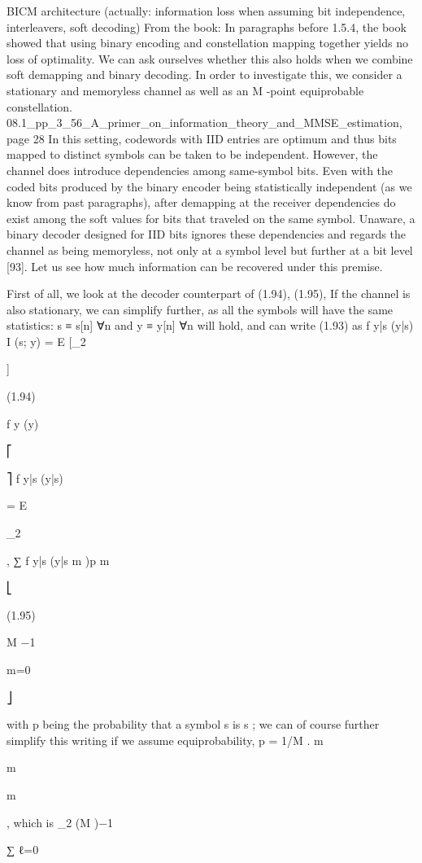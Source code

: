 {BICM architecture (actually: information loss when assuming bit independence, interleavers, soft decoding)
From the book:
In paragraphs before 1.5.4, the book showed that using binary encoding and constellation mapping together yields no loss of optimality. We can ask ourselves whether this also holds when we combine soft demapping and binary decoding.
In order to investigate this, we consider a stationary and memoryless channel as well as an M -point equiprobable constellation.
08.1_pp_3_56_A_primer_on_information_theory_and_MMSE_estimation, page 28 In this setting, codewords with IID entries are optimum and thus bits mapped to distinct symbols can be taken to be independent. However, the channel does introduce dependencies among same-symbol bits. Even with the coded bits produced by the binary encoder being statistically independent (as we know from past paragraphs), after demapping at the receiver dependencies do exist among the soft values for bits that traveled on the same symbol. Unaware, a binary decoder designed for IID bits ignores these dependencies and regards the channel as being memoryless, not only at a symbol level but further at a bit level [93]. Let us see how much information can be recovered under this premise.

First of all, we look at the decoder counterpart of (1.94), (1.95),
If the channel is also stationary, we can simplify further, as all the symbols will have the same statistics: s ≡ s[n] ∀n and y ≡ y[n] ∀n will hold, and can write (1.93) as f y|s (y|s)
I (s; y) = E [\log_2

]

(1.94)

f y (y)

⎡

⎤
f y|s (y|s)

= E

\log_2

,
∑ f y|s (y|s m )p m

⎣

(1.95)

M −1

m=0

⎦

with p being the probability that a symbol s is s ; we can of course further simplify this writing if we assume equiprobability, p = 1/M .
m

m

m

, which is
\log_2 (M )−1

∑
ℓ=0

}
